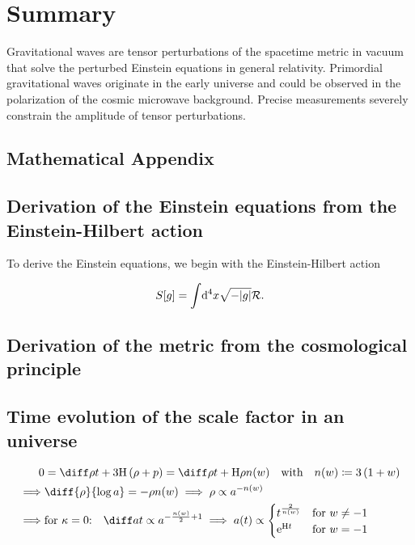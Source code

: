 \documentclass[12pt,parskip=half]{scrreprt}
\begin{document}
\chapter{Summary}\label{ch:summary}

Gravitational waves are tensor perturbations of the \FLRW spacetime metric in vacuum that solve the perturbed Einstein equations in general relativity. Primordial gravitational waves originate in the early universe and could be observed in the polarization of the cosmic microwave background. Precise measurements severely constrain the amplitude of tensor perturbations.






\begin{appendices}

\chapter{Mathematical Appendix}

\section{Derivation of the Einstein equations from the Einstein-Hilbert action}\label{app:deriv_einstein_eqns}

To derive the Einstein equations, we begin with the Einstein-Hilbert action

\begin{align}
	S[g] = \int \! \dif{^4x} \sqrt{-|g|} \Rscal \eqpunct{.}
\end{align}


\section{Derivation of the \FLRW metric from the cosmological principle}\label{app:deriv_frw}

\section{Time evolution of the scale factor in an \FLRW universe}\label{app:deriv_frw_a_evol}

\begin{align}
	0 &= \dt{\rho} + 3\Hcosm\del{\rho + p} = \dt{\rho} + \Hcosm\rho \nexp \quad \text{with} \quad \nexp \defeq 3\del{1 + \eosp} \\
	\implies &\diff{\rho}{\efold} = -\rho\nexp \implies \rho \propto a^{-\nexp} \\
	\implies &\text{for \(\spatcurv=0\):} \quad \dt{a} \propto a^{-\frac{\nexp}{2}+1} \implies a(t) \propto
	\begin{cases}
		t^{\frac{2}{\nexp}} &\text{for \(\eosp\neq-1\)} \\
		\eul^{\Hcosm t} &\text{for \(\eosp=-1\)}
	\end{cases}
\end{align}



\end{appendices}
\end{document}
